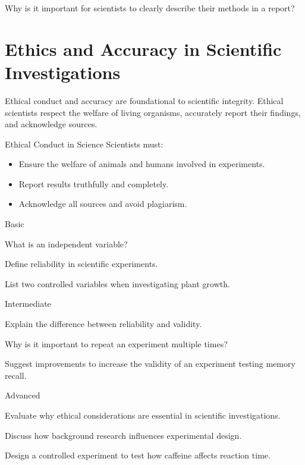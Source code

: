 \begin{stopandthink}
Why is it important for scientists to clearly describe their methods in a report?
\end{stopandthink}

\section{Ethics and Accuracy in Scientific Investigations}

Ethical conduct and accuracy are foundational to scientific integrity. Ethical scientists respect the welfare of living organisms, accurately report their findings, and acknowledge sources.

\begin{keyconcept}{Ethical Conduct in Science}
Scientists must:
\begin{itemize}
    \item Ensure the welfare of animals and humans involved in experiments.
    \item Report results truthfully and completely.
    \item Acknowledge all sources and avoid plagiarism.
\end{itemize}
\end{keyconcept}


\begin{tieredquestions}{Basic}
\item What is an independent variable?
\item Define reliability in scientific experiments.
\item List two controlled variables when investigating plant growth.
\end{tieredquestions}

\begin{tieredquestions}{Intermediate}
\item Explain the difference between reliability and validity.
\item Why is it important to repeat an experiment multiple times?
\item Suggest improvements to increase the validity of an experiment testing memory recall.
\end{tieredquestions}

\begin{tieredquestions}{Advanced}
\item Evaluate why ethical considerations are essential in scientific investigations.
\item Discuss how background research influences experimental design.
\item Design a controlled experiment to test how caffeine affects reaction time.
\end{tieredquestions}